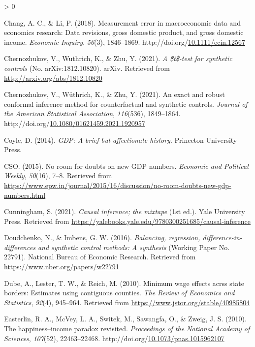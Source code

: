 \documentclass[12pt,nobind, a4paper]{reedthesis}
\newlength{\cslhangindent}
\newenvironment{CSLReferences}[2] %
{%
	\setlength{\parindent}{0pt}
	\ifodd #1 \everypar{\setlength{\hangindent}{\cslhangindent}}\ignorespaces\fi
	\ifnum #2 > 0
	\setlength{\parskip}{#2\baselineskip}
	\fi
}%
{}
\begin{document}
\begin{CSLReferences}{1}{0}
 \leavevmode\hypertarget{ref-chang_measurement_2018}{}%
 Chang, A. C., \& Li, P. (2018). Measurement error in macroeconomic data and economics research: Data revisions, gross domestic product, and gross domestic income. \emph{Economic Inquiry}, \emph{56}(3), 1846--1869. http://doi.org/\href{https://doi.org/10.1111/ecin.12567}{10.1111/ecin.12567}

 \leavevmode\hypertarget{ref-chernozhukov_t-test_2021}{}%
 Chernozhukov, V., Wuthrich, K., \& Zhu, Y. (2021). \emph{A \$t\$-test for synthetic controls} (No. {arXiv}:1812.10820). {arXiv}. Retrieved from \url{http://arxiv.org/abs/1812.10820}

 \leavevmode\hypertarget{ref-chernozhukov_exact_2021}{}%
 Chernozhukov, V., Wüthrich, K., \& Zhu, Y. (2021). An exact and robust conformal inference method for counterfactual and synthetic controls. \emph{Journal of the American Statistical Association}, \emph{116}(536), 1849--1864. http://doi.org/\href{https://doi.org/10.1080/01621459.2021.1920957}{10.1080/01621459.2021.1920957}

 \leavevmode\hypertarget{ref-coyle_gdp_2014}{}%
 Coyle, D. (2014). \emph{{GDP}: A brief but affectionate history}. Princeton University Press.

 \leavevmode\hypertarget{ref-cso_no_2015}{}%
 CSO. (2015). No room for doubts on new {GDP} numbers. \emph{Economic and Political Weekly}, \emph{50}(16), 7--8. Retrieved from \url{https://www.epw.in/journal/2015/16/discussion/no-room-doubts-new-gdp-numbers.html}

 \leavevmode\hypertarget{ref-cunningham_causal_2021}{}%
 Cunningham, S. (2021). \emph{Causal inference; the mixtape} (1st ed.). Yale University Press. Retrieved from \url{https://yalebooks.yale.edu/9780300251685/causal-inference}

 \leavevmode\hypertarget{ref-doudchenko_balancing_2016}{}%
 Doudchenko, N., \& Imbens, G. W. (2016). \emph{Balancing, regression, difference-in-differences and synthetic control methods: A synthesis} (Working Paper No. 22791). National Bureau of Economic Research. Retrieved from \url{https://www.nber.org/papers/w22791}

 \leavevmode\hypertarget{ref-dube_minimum_2010}{}%
 Dube, A., Lester, T. W., \& Reich, M. (2010). Minimum wage effects acrss state borders: Estimates using contiguous counties. \emph{The Review of Economics and Statistics}, \emph{92}(4), 945--964. Retrieved from \url{https://www.jstor.org/stable/40985804}

 \leavevmode\hypertarget{ref-easterlin_happinessincome_2010}{}%
 Easterlin, R. A., McVey, L. A., Switek, M., Sawangfa, O., \& Zweig, J. S. (2010). The happiness--income paradox revisited. \emph{Proceedings of the National Academy of Sciences}, \emph{107}(52), 22463--22468. http://doi.org/\href{https://doi.org/10.1073/pnas.1015962107}{10.1073/pnas.1015962107}


\end{CSLReferences}
\end{document}
